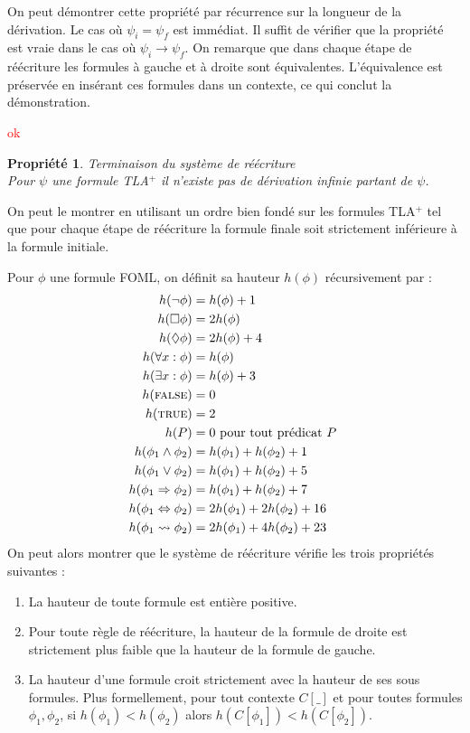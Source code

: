 \documentclass[12pt]{article}
\newcommand{\raph}[1]{\textcolor{red}{#1}}
\newcommand{\TRUE}{\textsc{true}}
\newcommand{\FALSE}{\textsc{false}}
\newtheorem{prop}{Propriété}
\begin{document}
On peut démontrer cette propriété par récurrence sur la longueur de la dérivation.
Le cas où $\psi_i = \psi_f$ est immédiat. Il suffit de vérifier que la propriété est vraie dans le cas où $\psi_i \longrightarrow \psi_f$.
On remarque que dans chaque étape de réécriture les formules à gauche et à droite sont équivalentes.
L'équivalence est préservée en insérant ces formules dans un contexte,
ce qui conclut la démonstration.

\raph{ok}

\begin{prop} \emph{Terminaison du système de réécriture} \\
  Pour $\psi$ une formule TLA$^+$ il n'existe pas de dérivation infinie partant de $\psi$.
\end{prop}

On peut le montrer en utilisant un ordre bien fondé sur les formules TLA$^+$ tel que pour chaque étape de réécriture la formule finale soit strictement inférieure à la formule initiale.

Pour $\phi$ une formule FOML, on définit sa hauteur \( h(\phi) \) récursivement par :
\begin{align*}
  h(\neg \phi) & = h(\phi) + 1 \\
  h(\Box \phi) & = 2h(\phi) \\
  h(\Diamond \phi) & = 2h(\phi) + 4 \\
  h(\forall x : \phi) & = h(\phi) \\
  h(\exists x : \phi) & = h(\phi) + 3 \\
  h(\FALSE) & = 0 \\
  h(\TRUE) & = 2 \\
  h(P) & = 0 \textup{ pour tout prédicat \(P\) } \\
  h(\phi_1 \land \phi_2) & = h(\phi_1) + h(\phi_2) + 1\\
  h(\phi_1 \lor \phi_2) & = h(\phi_1) + h(\phi_2) + 5\\
  h(\phi_1 \Rightarrow \phi_2) & = h(\phi_1) + h(\phi_2) + 7\\
  h(\phi_1 \Leftrightarrow \phi_2) & = 2h(\phi_1) + 2h(\phi_2) + 16\\
  h(\phi_1 \leadsto \phi_2) & = 2h(\phi_1) + 4h(\phi_2) + 23
\end{align*}
On peut alors montrer que le système de réécriture vérifie les trois propriétés suivantes :
\begin{enumerate}
\item La hauteur de toute formule est entière positive.
\item Pour toute règle de réécriture, la hauteur de la formule de droite est strictement plus faible que la hauteur de la formule de gauche.
\item La hauteur d'une formule croit strictement avec la hauteur de ses sous formules.
  Plus formellement, pour tout contexte \( C[\_] \) et pour toutes formules \( \phi_1, \phi_2 \), si \( h(\phi_1) < h(\phi_2) \) alors \( h(C[\phi_1]) < h(C[\phi_2]) \).
\end{enumerate}
\end{document}
